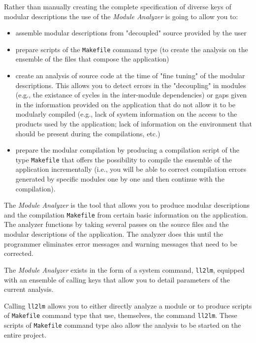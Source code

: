 Rather than manually creating the complete specification of diverse keys of modular descriptions the use of the {\em Module Analyzer} is going to allow you to: 
\begin{itemize}
\item assemble modular descriptions from "decoupled" source provided by the user
\item prepare scripts of the {\tt Makefile} command type (to create the analysis on the ensemble of the files that compose the application)
\item create an analysis of source code at the time of "fine tuning" of the modular descriptions.  This allows you to detect errors in the "decoupling" in modules (e.g., the existance of cycles in the inter-module dependencies) or gaps given in the information provided on the application that do not allow it to be modularly compiled (e.g., lack of system information on the access to the products used by the application; lack of information on the environment that should be present during the compilations, etc.)
\item prepare the modular compilation by producing a compilation script of the type {\tt Makefile} that offers the possibility to compile the ensemble of the application incrementally (i.e., you will be able to correct compilation errors generated by specific modules one by one and then continue with the compilation).
\end{itemize}



The {\em Module Analyzer} is the tool that allows you to produce modular descriptions and the compilation {\tt Makefile} from certain basic information on the application. 
The analyzer functions by taking several passes on the source files and the modular descriptions of the application.  The analyzer does this until the programmer eliminates error messages and warning messages that need to be corrected.


The {\em Module Analyzer} exists in the form of a system command, {\tt ll2lm}, equipped with an ensemble of calling keys that allow you to 
detail parameters of the current analysis.

Calling {\tt ll2lm} allows you to either directly analyze a module or to produce scripts of {\tt Makefile} command type that use, themselves, the command {\tt ll2lm}.  
These scripts of {\tt Makefile} command type also allow the analysis to be started on the entire project.


